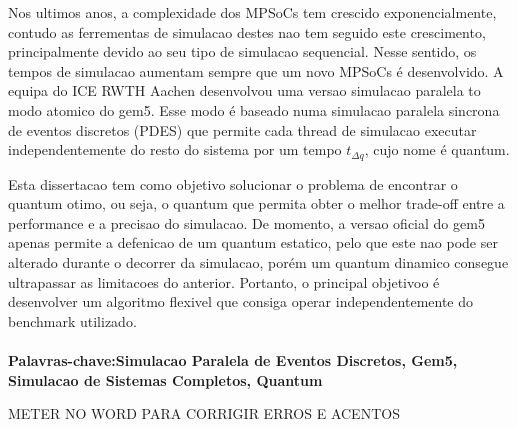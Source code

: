 

Nos ultimos anos, a complexidade dos MPSoCs tem crescido exponencialmente, contudo as ferrementas de simulacao destes nao tem seguido este crescimento, principalmente devido ao seu tipo de simulacao sequencial. Nesse sentido, os tempos de simulacao aumentam sempre que um novo MPSoCs é desenvolvido. A equipa do ICE RWTH Aachen desenvolvou uma versao simulacao paralela to modo atomico do gem5. Esse modo é baseado numa simulacao paralela sincrona de eventos discretos (PDES) que permite cada thread de simulacao executar independentemente do resto do sistema por um tempo $t_{\Delta q}$, cujo nome é quantum.

Esta dissertacao tem como objetivo solucionar o problema de encontrar o quantum otimo, ou seja, o quantum que permita obter o melhor trade-off entre a performance e a precisao do simulacao. De momento, a versao oficial do gem5 apenas permite a defenicao de um quantum estatico, pelo que este nao pode ser alterado durante o decorrer da simulacao, porém um quantum dinamico consegue ultrapassar as limitacoes do anterior. Portanto, o principal objetivoo é desenvolver um algoritmo flexivel que consiga operar independentemente do benchmark utilizado. 

\paragraph{}\textbf{Palavras-chave:Simulacao Paralela de Eventos Discretos, Gem5, Simulacao de Sistemas Completos, Quantum} 

METER NO WORD PARA CORRIGIR ERROS E ACENTOS